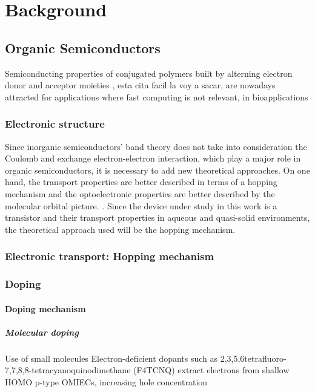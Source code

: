 {\chapter{Background}}
\label{sec:background}

\section{Organic Semiconductors}

Semiconducting properties of conjugated polymers built by alterning electron donor and acceptor moieties \cite{matt_electronic_2021}, esta cita facil la voy a sacar, are nowadays attracted for applications where fast computing is not relevant, in bioapplications


\subsection{Electronic structure}

Since inorganic semiconductors' band theory does not take into consideration the Coulomb and exchange electron-electron interaction, which play a major role in organic semiconductors, it is necessary to add new theoretical approaches. On one hand, the transport properties are better described in terms of a hopping mechanism and the optoelectronic properties are better described by the molecular orbital picture. \cite{alcacer_electronic_2018}. Since the device under study in this work is a transistor and their transport properties in aqueous and quasi-solid environments, the theoretical approach used will be the hopping mechanism.

\subsection{Electronic transport: Hopping mechanism}

\subsection{Doping}
\subsubsection{Doping mechanism}
\paragraph{Molecular doping}
Use of small molecules
Electron-deficient dopants such as 2,3,5,6tetrafluoro-7,7,8,8-tetracyanoquinodimethane (F4TCNQ) extract electrons from shallow HOMO p-type OMIECs, increasing hole concentration \cite{tan_organic_2022}

